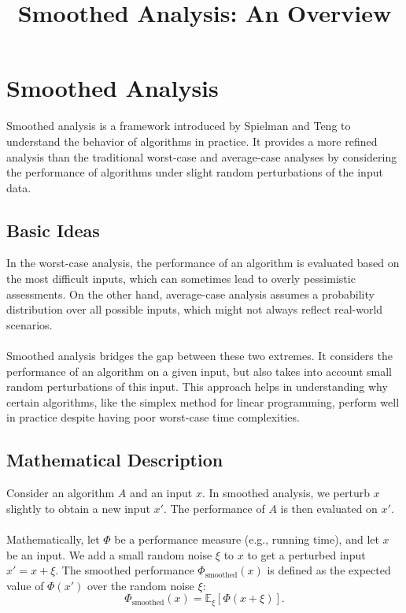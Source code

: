 \documentclass{article}
\title{Smoothed Analysis: An Overview}
\author{}
\date{}
\begin{document}
\maketitle

\section{Smoothed Analysis}
Smoothed analysis is a framework introduced by Spielman and Teng to understand the behavior of algorithms in practice. It provides a more refined analysis than the traditional worst-case and average-case analyses by considering the performance of algorithms under slight random perturbations of the input data.

\subsection{Basic Ideas}
In the worst-case analysis, the performance of an algorithm is evaluated based on the most difficult inputs, which can sometimes lead to overly pessimistic assessments. On the other hand, average-case analysis assumes a probability distribution over all possible inputs, which might not always reflect real-world scenarios.
\\\\
Smoothed analysis bridges the gap between these two extremes. It considers the performance of an algorithm on a given input, but also takes into account small random perturbations of this input. This approach helps in understanding why certain algorithms, like the simplex method for linear programming, perform well in practice despite having poor worst-case time complexities.

\subsection{Mathematical Description}
Consider an algorithm $A$ and an input $x$. In smoothed analysis, we perturb $x$ slightly to obtain a new input $x'$. The performance of $A$ is then evaluated on $x'$.
\\\\
Mathematically, let $\Phi$ be a performance measure (e.g., running time), and let $x$ be an input. We add a small random noise $\xi$ to $x$ to get a perturbed input $x' = x + \xi$. The smoothed performance $\Phi_{\text{smoothed}}(x)$ is defined as the expected value of $\Phi(x')$ over the random noise $\xi$:
\[
\Phi_{\text{smoothed}}(x) = \mathbb{E}_{\xi}[\Phi(x + \xi)].
\]
\end{document}
